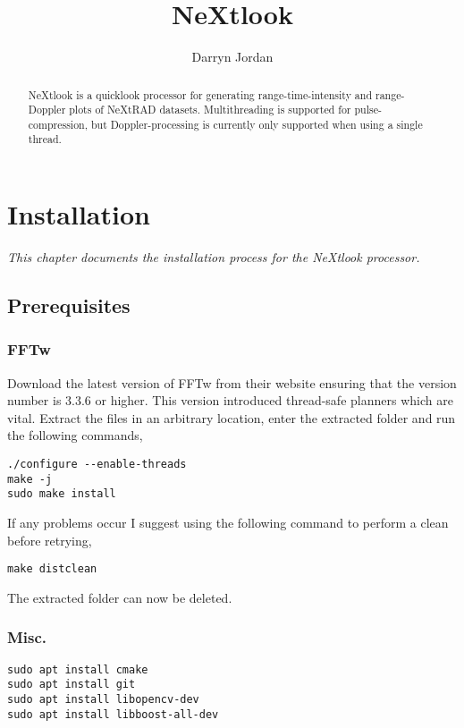 \documentclass[a4paper,11pt]{report}
\title{NeXtlook}
\author{Darryn Jordan}
\begin{document}
\maketitle
\tableofcontents

\begin{abstract}
NeXtlook is a quicklook processor for generating range-time-intensity and range-Doppler plots of NeXtRAD datasets. Multithreading is supported for pulse-compression, but Doppler-processing is currently only supported when using a single thread.
\end{abstract}

\chapter{Installation}
\textit{This chapter documents the installation process for the NeXtlook processor.}
\section{Prerequisites}
\subsection{FFTw}
Download the latest version of FFTw from their website ensuring that the version number is 3.3.6 or higher. This version introduced thread-safe planners which are vital. 
Extract the files in an arbitrary location, enter the extracted folder and run the following commands,
\begin{lstlisting}
./configure --enable-threads
make -j
sudo make install
\end{lstlisting}
If any problems occur I suggest using the following command to perform a clean before retrying,
\begin{lstlisting}
make distclean
\end{lstlisting}
The extracted folder can now be deleted.
\subsection{Misc.}
\begin{lstlisting}
sudo apt install cmake
sudo apt install git
sudo apt install libopencv-dev
sudo apt install libboost-all-dev
\end{lstlisting}
\end{document}
